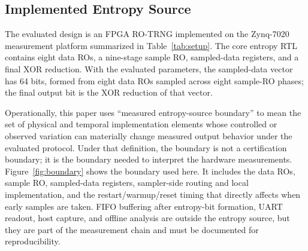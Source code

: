 \documentclass[journal]{IEEEtran}
\newcommand{\rotrng}{RO-TRNG}
\begin{document}
\subsection{Implemented Entropy Source}

The evaluated design is an FPGA \rotrng{} implemented on the Zynq-7020 measurement platform summarized in Table~\ref{tab:setup}. The core entropy RTL contains eight data ROs, a nine-stage sample RO, sampled-data registers, and a final XOR reduction. With the evaluated parameters, the sampled-data vector has 64 bits, formed from eight data ROs sampled across eight sample-RO phases; the final output bit is the XOR reduction of that vector.

Operationally, this paper uses ``measured entropy-source boundary'' to mean the set of physical and temporal implementation elements whose controlled or observed variation can materially change measured output behavior under the evaluated protocol. Under that definition, the boundary is not a certification boundary; it is the boundary needed to interpret the hardware measurements. Figure~\ref{fig:boundary} shows the boundary used here. It includes the data ROs, sample RO, sampled-data registers, sampler-side routing and local implementation, and the restart/warmup/reset timing that directly affects when early samples are taken. FIFO buffering after entropy-bit formation, UART readout, host capture, and offline analysis are outside the entropy source, but they are part of the measurement chain and must be documented for reproducibility.
\end{document}
